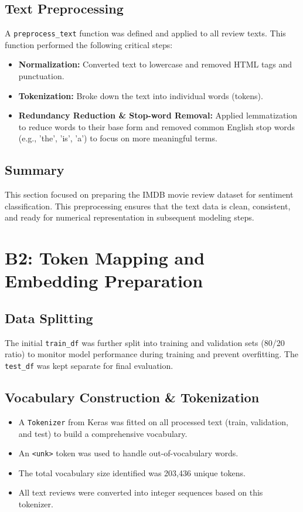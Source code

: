 \documentclass{article}
\begin{document}
\subsection*{Text Preprocessing}
A \texttt{preprocess\_text} function was defined and applied to all review texts. This function performed the following critical steps:
\begin{itemize}
    \item \textbf{Normalization:} Converted text to lowercase and removed HTML tags and punctuation.
    \item \textbf{Tokenization:} Broke down the text into individual words (tokens).
    \item \textbf{Redundancy Reduction \& Stop-word Removal:} Applied lemmatization to reduce words to their base form and removed common English stop words (e.g., 'the', 'is', 'a') to focus on more meaningful terms.
\end{itemize}

\subsection*{Summary}
This section focused on preparing the IMDB movie review dataset for sentiment classification. This preprocessing ensures that the text data is clean, consistent, and ready for numerical representation in subsequent modeling steps.

\section{B2: Token Mapping and Embedding Preparation}

\subsection*{Data Splitting}
The initial \texttt{train\_df} was further split into training and validation sets (80/20 ratio) to monitor model performance during training and prevent overfitting. The \texttt{test\_df} was kept separate for final evaluation.

\subsection*{Vocabulary Construction \& Tokenization}
\begin{itemize}
    \item A \texttt{Tokenizer} from Keras was fitted on all processed text (train, validation, and test) to build a comprehensive vocabulary.
    \item An \texttt{<unk>} token was used to handle out-of-vocabulary words.
    \item The total vocabulary size identified was 203,436 unique tokens.
    \item All text reviews were converted into integer sequences based on this tokenizer.
\end{itemize}
\end{document}
